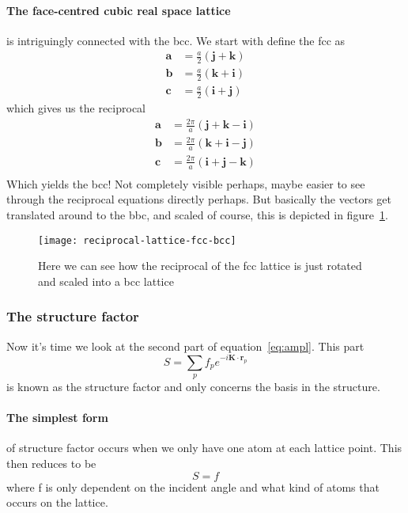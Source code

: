 \documentclass[11pt]{article}
\begin{document}
\paragraph{The face-centred cubic real space lattice} is intriguingly connected with the bcc. We start with define the fcc as
\begin{align}
	\mathbf{a} &= \frac{a}{2} (\mathbf{j} + \mathbf{k}) \nonumber\\
	\mathbf{b} &= \frac{a}{2} (\mathbf{k} + \mathbf{i}) \nonumber\\
	\mathbf{c} &= \frac{a}{2} (\mathbf{i} + \mathbf{j}) 
\end{align}
which gives us the reciprocal
\begin{align}
	\mathbf{a} &= \frac{2\pi}{a} (\mathbf{j} + \mathbf{k} - \mathbf{i}) \nonumber\\
	\mathbf{b} &= \frac{2\pi}{a} (\mathbf{k} + \mathbf{i} - \mathbf{j}) \nonumber\\
	\mathbf{c} &= \frac{2\pi}{a} (\mathbf{i} + \mathbf{j} - \mathbf{k}) \nonumber\\
\end{align}
Which yields the bcc! Not completely visible perhaps, maybe easier to see through the reciprocal equations directly perhaps. But basically the vectors get translated around to the bbc, and scaled of course, this is depicted in figure~\ref{fig:fcc-bcc}.
\begin{figure}[!h]
	\centering
	\texttt{[image: reciprocal-lattice-fcc-bcc]}
	\caption{Here we can see how the reciprocal of the fcc lattice is just rotated and scaled into a bcc lattice}
	\label{fig:fcc-bcc}
\end{figure}

\newpage
\subsubsection{The structure factor}
Now it's time we look at the second part of equation~\ref{eq:ampl}. This part 
\begin{equation}
	S = \sum_p f_p e^{-i\mathbf{K} \cdot \mathbf{r}_p}
	\label{eq:structure-factor}
\end{equation}
is known as the structure factor and only concerns the basis in the structure. 

\paragraph{The simplest form} of structure factor occurs when we only have one atom at each lattice point. This then reduces to be 
\begin{equation}
	S = f
\end{equation}
where f is only dependent on the incident angle and what kind of atoms that occurs on the lattice.
\end{document}
